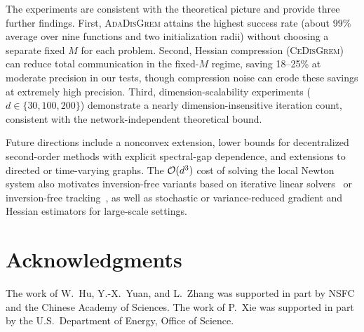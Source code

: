 \documentclass[review,onefignum,onetabnum]{siamart171218}
\begin{document}
	The experiments are consistent with the theoretical picture and provide
	three further findings. First, \textsc{AdaDisGrem} attains the highest success rate
	(about 99\% average over nine functions and two initialization radii)
	without choosing a separate fixed $M$ for each problem. Second, Hessian compression
	(\textsc{CeDisGrem}) can reduce
	total communication in the fixed-$M$ regime, saving 18--25\% at
	moderate precision in our tests, though compression noise can erode
	these savings at extremely high precision. Third, dimension-scalability
	experiments ($d\in\{30,100,200\}$) demonstrate a nearly dimension-insensitive
	iteration count, consistent with the network-independent theoretical bound.
	
	Future directions include a nonconvex extension, lower bounds for
	decentralized second-order methods with explicit spectral-gap dependence,
	and extensions to directed or time-varying graphs.
	The $\mathcal{O}(d^3)$ cost of solving the local Newton system also motivates
	inversion-free variants based on iterative linear solvers~\citep{jakovetic2025dinas}
	or inversion-free tracking~\citep{yuan2023indo}, as well as stochastic
	or variance-reduced gradient and Hessian estimators for large-scale settings.
	
	
	\section*{Acknowledgments}
	The work of W.~Hu, Y.-X.~Yuan, and L.~Zhang was supported in part by NSFC and the Chinese Academy of Sciences.
	The work of P.~Xie was supported in part by the U.S.\ Department of Energy, Office of Science.
	
\end{document}
